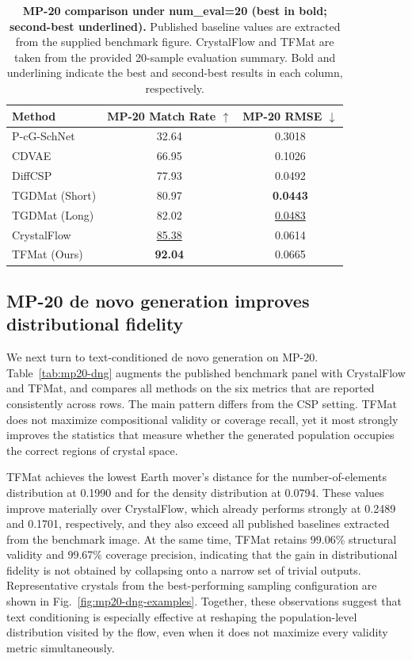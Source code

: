 \documentclass[fleqn,10pt]{wlscirep}
\begin{document}
\begin{table}[ht]
\centering
\caption{\textbf{MP-20 comparison under num\_eval=20 (best in bold; second-best underlined).} Published baseline values are extracted from the supplied benchmark figure. CrystalFlow and TFMat are taken from the provided 20-sample evaluation summary. Bold and underlining indicate the best and second-best results in each column, respectively.}
\label{tab:mp20-evo20}
\small
\setlength{\tabcolsep}{6pt}
\begin{tabular}{lcc}
\toprule
Method & MP-20 Match Rate $\uparrow$ & MP-20 RMSE $\downarrow$ \\
\midrule
P-cG-SchNet    & 32.64 & 0.3018 \\
CDVAE          & 66.95 & 0.1026 \\
DiffCSP        & 77.93 & 0.0492 \\
TGDMat (Short) & 80.97 & \textbf{0.0443} \\
TGDMat (Long)  & 82.02 & \underline{0.0483} \\
CrystalFlow    & \underline{85.38} & 0.0614 \\
TFMat (Ours)      & \textbf{92.04} & 0.0665 \\
\bottomrule
\end{tabular}
\end{table}

\subsection*{MP-20 de novo generation improves distributional fidelity}
We next turn to text-conditioned de novo generation on MP-20. Table~\ref{tab:mp20-dng} augments the published benchmark panel with CrystalFlow and TFMat, and compares all methods on the six metrics that are reported consistently across rows. The main pattern differs from the CSP setting. TFMat does not maximize compositional validity or coverage recall, yet it most strongly improves the statistics that measure whether the generated population occupies the correct regions of crystal space.

TFMat achieves the lowest Earth mover's distance for the number-of-elements distribution at 0.1990 and for the density distribution at 0.0794. These values improve materially over CrystalFlow, which already performs strongly at 0.2489 and 0.1701, respectively, and they also exceed all published baselines extracted from the benchmark image. At the same time, TFMat retains 99.06\% structural validity and 99.67\% coverage precision, indicating that the gain in distributional fidelity is not obtained by collapsing onto a narrow set of trivial outputs. Representative crystals from the best-performing sampling configuration are shown in Fig.~\ref{fig:mp20-dng-examples}. Together, these observations suggest that text conditioning is especially effective at reshaping the population-level distribution visited by the flow, even when it does not maximize every validity metric simultaneously.
\end{document}
